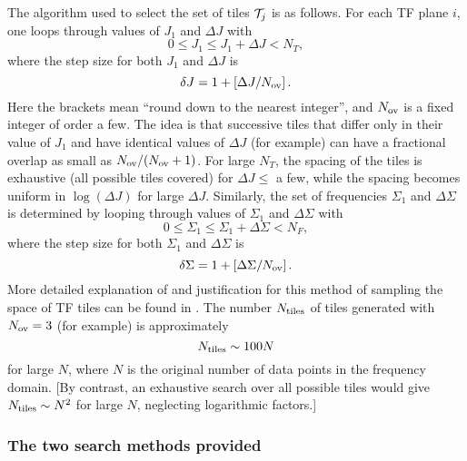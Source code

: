 \documentclass{article}
\begin{document}
The algorithm used to select the set of tiles ${\cal T}_j$ is as
follows.  For each TF plane $i$, one loops through values of $J_1$
and $\Delta J$ with
\begin{equation}
0 \le J_1 \le J_1 + \Delta J < N_T,
\end{equation}
where the step size for both $J_1$ and $\Delta J$ is
\begin{equation}
\delta J = 1 + \left[\Delta J / N_{\rm ov} \right].
\end{equation}
Here the brackets mean ``round down to the nearest integer'', and
$N_{\rm ov}$ is a fixed integer of order a few.  The idea is that
successive tiles that differ only in their value of $J_1$ and have
identical values of $\Delta J$ (for example) can have a fractional
overlap as small as $N_{\rm ov} / (N_{\rm ov} + 1)$.  For large $N_T$,
the spacing of the tiles is exhaustive (all possible tiles covered)
for $\Delta J \le $ a few, while the spacing becomes uniform in $\log
(\Delta J)$ for large $\Delta J$.  Similarly, the set of frequencies
$\Sigma_1$ and $\Delta \Sigma$ is determined by 
looping through values of $\Sigma_1$
and $\Delta \Sigma$ with
\begin{equation}
0 \le \Sigma_1 \le \Sigma_1 + \Delta \Sigma < N_F,
\end{equation}
where the step size for both $\Sigma_1$ and $\Delta \Sigma$ is
\begin{equation}
\delta \Sigma = 1 + \left[\Delta \Sigma / N_{\rm ov} \right].
\end{equation}
More detailed explanation of and justification for this method of
sampling the space of TF tiles can be found in \cite{abcf:2000}.
The number $N_{\rm tiles}$ of tiles generated with $N_{\rm ov}=3$ (for
example) is
approximately 
\begin{equation}
N_{\rm tiles} \sim 100 N
\end{equation}
for large $N$, where $N$ is the original number of data points in the
frequency domain.  [By
contrast, an exhaustive search over all possible tiles would give
$N_{\rm tiles} \sim N^2$ for large $N$, neglecting logarithmic factors.]


\subsubsection{The two search methods provided}
\label{twomethods}
\end{document}
